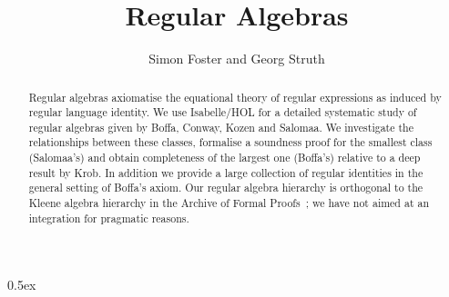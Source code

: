 \documentclass[11pt,a4paper]{article}
\begin{document}
\title{Regular Algebras}
\author{Simon Foster and Georg Struth}
\maketitle

\begin{abstract}
  Regular algebras axiomatise the equational theory of regular 
  expressions as induced by regular language identity.  We use 
  Isabelle/HOL for a detailed systematic study of regular algebras 
  given by Boffa, Conway, Kozen and Salomaa. We investigate the 
  relationships between these classes, formalise a soundness proof for 
  the smallest class (Salomaa's) and obtain completeness of the 
  largest one (Boffa's) relative to a deep result by Krob. In 
  addition we provide a large collection of regular identities 
  in the general setting of Boffa's axiom. Our regular algebra 
  hierarchy is orthogonal to the Kleene algebra hierarchy in the 
  Archive of Formal Proofs~\cite{ArmstrongStruthWeberArchive}; we 
  have not aimed at an integration for pragmatic reasons.
\end{abstract}

\tableofcontents

\parindent 0pt\parskip 0.5ex





\end{document}
